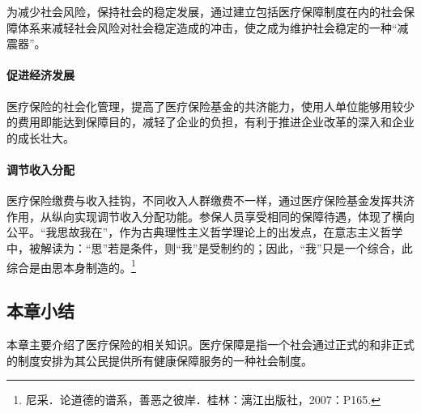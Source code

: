 为减少社会风险，保持社会的稳定发展，通过建立包括医疗保障制度在内的社会保障体系来减轻社会风险对社会稳定造成的冲击，使之成为维护社会稳定的一种“减震器”。

\paragraph{促进经济发展}

医疗保险的社会化管理，提高了医疗保险基金的共济能力，使用人单位能够用较少的费用即能达到保障目的，减轻了企业的负担，有利于推进企业改革的深入和企业的成长壮大。

\paragraph{调节收入分配}

医疗保险缴费与收入挂钩，不同收入人群缴费不一样，通过医疗保险基金发挥共济作用，从纵向实现调节收入分配功能。参保人员享受相同的保障待遇，体现了横向公平。“我思故我在”，作为古典理性主义哲学理论上的出发点，在意志主义哲学中，被解读为：“思”若是条件，则“我”是受制约的；因此，“我”只是一个综合，此综合是由思本身制造的。\footnote{尼采．论道德的谱系，善恶之彼岸．桂林：漓江出版社，2007：P165.}

\subsection{本章小结}

本章主要介绍了医疗保险的相关知识。医疗保障是指一个社会通过正式的和非正式的制度安排为其公民提供所有健康保障服务的一种社会制度。
